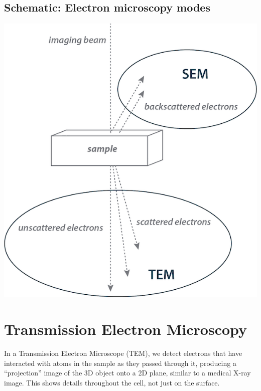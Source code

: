 \documentclass[]{tufte-book}
\begin{document}
\hypertarget{Electron_microscopy_modes}{\subsection*{Schematic: Electron
microscopy modes}\label{Electron_microscopy_modes}}

\includegraphics{img/schematics/1_3_1}

\section{Transmission Electron
Microscopy}\label{transmission-electron-microscopy}

In a Transmission Electron Microscope (TEM), we detect electrons that
have interacted with atoms in the sample as they passed through it,
producing a ``projection'' image of the 3D object onto a 2D plane,
similar to a medical X-ray image. This shows details throughout the
cell, not just on the surface.
\end{document}
